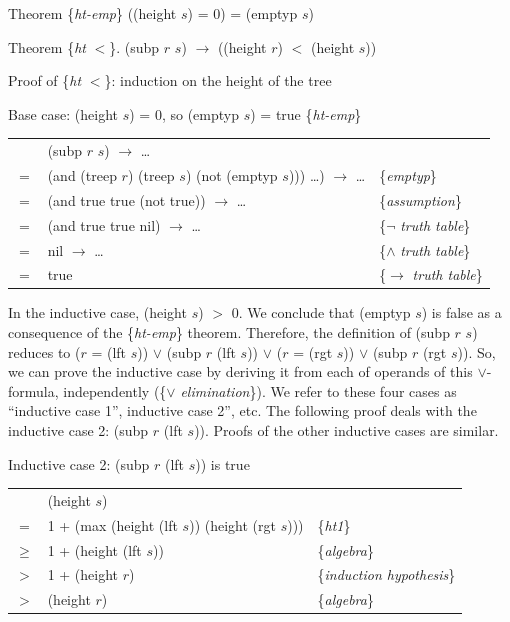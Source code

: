 Theorem \{\emph{ht-emp}\} ((height $s$) = 0) = (emptyp $s$)

Theorem \{\emph{ht} $<$\}. (subp $r$ $s$) $\rightarrow$ ((height $r$) $<$ (height $s$))

Proof of \{\emph{ht} $<$\}: induction on the height of the tree

Base case: (height $s$) = 0, so (emptyp $s$) = true \{\emph{ht-emp}\}

\begin{tabular}{rll}
     & (subp $r$ $s$) $\rightarrow$ \dots              & \\
 $=$ & (and (treep $r$) (treep $s$) (not (emptyp $s$))) \dots)  $\rightarrow$ \dots & \{\emph{emptyp}\} \\
 $=$ & (and true true (not true)) $\rightarrow$ \dots  & \{\emph{assumption}\} \\
 $=$ & (and true true nil) $\rightarrow$ \dots         & \{$\neg$ \emph{truth table}\} \\
 $=$ & nil $\rightarrow$ \dots                         & \{$\wedge$ \emph{truth table}\} \\
 $=$ & true                                            & \{$\rightarrow$ \emph{truth table}\} \\
\end{tabular}

In the inductive case, (height $s$) $>$ 0.
We conclude that (emptyp $s$) is false
as a consequence of the \{\emph{ht-emp}\} theorem.
Therefore, the definition of (subp $r$ $s$) reduces to
($r$ = (lft $s$)) $\vee$ (subp $r$ (lft $s$)) $\vee$
($r$ = (rgt $s$)) $\vee$ (subp $r$ (rgt $s$)).
So, we can prove the inductive case by deriving it from
each of operands of this $\vee$-formula, independently (\{$\vee$ \emph{elimination}\}).
We refer to these four cases as ``inductive case 1'', inductive case 2'', etc.
The following proof deals with the inductive case 2: (subp $r$ (lft $s$)).
Proofs of the other inductive cases are similar.

Inductive case 2: (subp $r$ (lft $s$)) is true

\begin{tabular}{rll}
       & (height $s$)                                    & \\
 $=$   & 1 + (max (height (lft $s$)) (height (rgt $s$))) & \{\emph{ht1}\} \\
 $\ge$ & 1 + (height (lft $s$))                          & \{\emph{algebra}\} \\
 $>$   & 1 + (height $r$)                                & \{\emph{induction hypothesis}\} \\
 $>$   & (height $r$)                                    & \{\emph{algebra}\} \\
\end{tabular}


